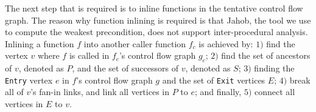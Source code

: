 The next step that is required is to inline functions in the tentative control flow graph.
The reason why function inlining is required is that Jahob, the tool we use to compute
the weakest precondition, does not support inter-procedural analysis. 
Inlining a function $f$ into another caller function $f_c$ is achieved by:
$1)$ find the vertex $v$ where $f$ is called in $f_c$'s control flow graph $g_c$;
$2)$ find the set of ancestors of $v$, denoted as $P$, and the set of successors of $v$, denoted as $S$; 
$3)$ finding the \texttt{Entry} vertex $e$ in $f$'s control flow graph $g$ and the set of \texttt{Exit} vertices $E$; 
$4)$ break all of $v$'s fan-in links, and link all vertices in $P$ to $e$; and finally, 
$5)$ connect all vertices in $E$ to $v$.
\fi


